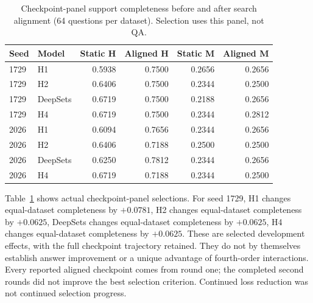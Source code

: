 \begin{table}[t]\centering\small
\caption{Checkpoint-panel support completeness before and after search alignment (64 questions per dataset). Selection uses this panel, not QA.}
\label{tab:aligned}
\begin{tabular}{llrrrr}\toprule
Seed & Model & Static H & Aligned H & Static M & Aligned M\\\midrule
1729 & H1 & 0.5938 & 0.7500 & 0.2656 & 0.2656\\
1729 & H2 & 0.6406 & 0.7500 & 0.2344 & 0.2500\\
1729 & DeepSets & 0.6719 & 0.7500 & 0.2188 & 0.2656\\
1729 & H4 & 0.6719 & 0.7500 & 0.2344 & 0.2812\\
2026 & H1 & 0.6094 & 0.7656 & 0.2344 & 0.2656\\
2026 & H2 & 0.6406 & 0.7188 & 0.2500 & 0.2500\\
2026 & DeepSets & 0.6250 & 0.7812 & 0.2344 & 0.2656\\
2026 & H4 & 0.6719 & 0.7188 & 0.2344 & 0.2500\\
\bottomrule\end{tabular}\end{table}

Table~\ref{tab:aligned} shows actual checkpoint-panel selections. For seed 1729, H1 changes equal-dataset completeness by $+0.0781$, H2 changes equal-dataset completeness by $+0.0625$, DeepSets changes equal-dataset completeness by $+0.0625$, H4 changes equal-dataset completeness by $+0.0625$. These are selected development effects, with the full checkpoint trajectory retained. They do not by themselves establish answer improvement or a unique advantage of fourth-order interactions. Every reported aligned checkpoint comes from round one; the completed second rounds did not improve the best selection criterion. Continued loss reduction was not continued selection progress.
